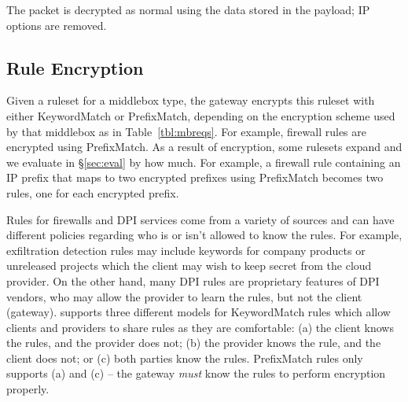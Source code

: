  The packet is decrypted as normal using the data stored in the payload; IP options are removed.



\subsection{Rule Encryption}
\label{sec:rulenc}

Given a ruleset for a middlebox type, the gateway encrypts this ruleset with either KeywordMatch or PrefixMatch, depending on the encryption scheme used by that middlebox as in Table~\ref{tbl:mbreqs}. For example, firewall rules are encrypted using PrefixMatch. As a result of encryption, some rulesets expand and we evaluate in \S\ref{sec:eval} by how much. For example, a firewall rule containing an IP prefix that maps to two encrypted prefixes using PrefixMatch becomes two rules, one for each encrypted prefix.
 


Rules for firewalls and DPI services come from a variety of sources and can have different policies regarding who is or isn't allowed to know the rules. 
For example, exfiltration detection rules may include keywords for company products or unreleased projects which the client may wish to keep secret from the cloud provider. 
On the other hand, many DPI rules are proprietary features of DPI vendors, who may allow the provider to learn the rules, but not the client (gateway).
\sys supports three different models for KeywordMatch rules which allow clients and providers to share rules as they are comfortable: (a) the client knows the rules, and the provider does not; (b) the provider knows the rule, and the client does not; or (c) both parties know the rules.
PrefixMatch rules only supports (a) and (c) -- the gateway {\it must} know the rules to perform encryption properly.

